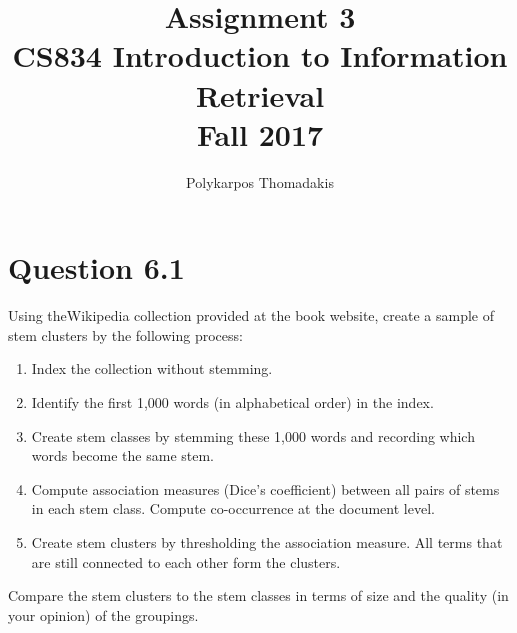 \documentclass{article}
\author{Polykarpos Thomadakis}
\title{Assignment 3 \\
	\large CS834 Introduction to Information Retrieval\\Fall 2017}
\begin{document}
	\maketitle
	\section*{Question 6.1}
	Using theWikipedia collection provided at the book website, create a sample
	of stem clusters by the following process:
	\begin{enumerate}
	\item Index the collection without stemming.
	\item  Identify the first 1,000 words (in alphabetical order) in the index.
	\item Create stem classes by stemming these 1,000 words and recording which words become the same stem.
	\item Compute association measures (Dice’s coefficient) between all pairs of stems in each stem class. Compute co-occurrence at the document level.
	\item Create stem clusters by thresholding the association measure. All terms that are still connected to each other form the clusters.
	\end{enumerate}
	Compare the stem clusters to the stem classes in terms of size and the quality (in your opinion) of the groupings.
\end{document}
